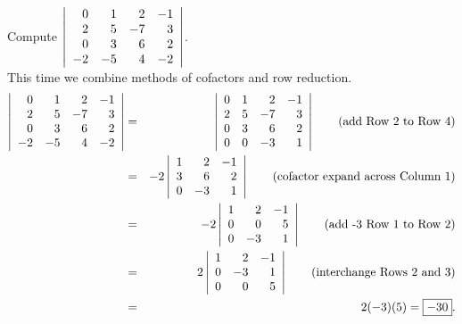 \begin{Exam} Compute $\dtx{rrrr}{0&1&2&-1\\2&5&-7&3\\0&3&6&2\\-2&-5&4&-2}$.\\

This time we combine methods of cofactors and row reduction.
\begin{eqnarray*}
\dtx{rrrr}{0&1&2&-1\\2&5&-7&3\\0&3&6&2\\-2&-5&4&-2} &=& \dtx{rrrr}{0&1&2&-1\\2&5&-7&3\\0&3&6&2\\0&0&-3&1} \qquad\text{(add Row 2 to Row 4)}\\
&=& -2\dtx{rrr}{1&2&-1\\3&6&2\\0&-3&1} \qquad\text{(cofactor expand across Column 1)}\\
&=& -2\dtx{rrr}{1&2&-1\\0&0&5\\0&-3&1} \qquad\text{(add -3 Row 1 to Row 2)}\\
&=& 2\dtx{rrr}{1&2&-1\\0&-3&1\\0&0&5} \qquad\text{(interchange Rows 2 and 3)}\\
&=& 2(-3)(5) = \fbox{$-30$}.
\end{eqnarray*}
\end{Exam}


